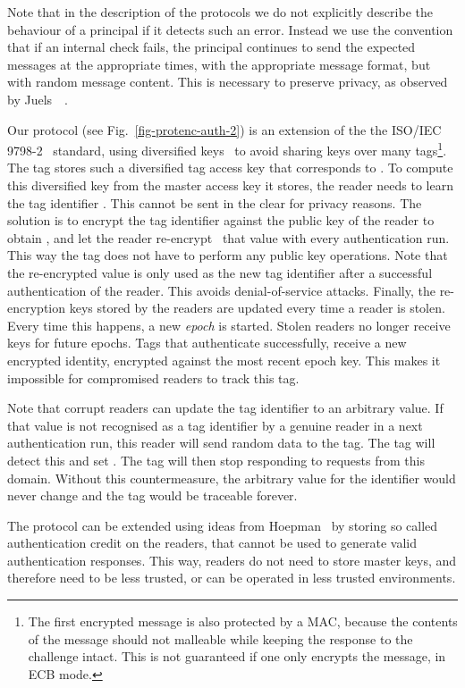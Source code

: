 Note that in the description of the protocols we do not explicitly describe the
behaviour of a principal if it detects such an error. Instead we use the
convention that if an internal check fails, the principal continues to send the
expected messages at the appropriate times, with the appropriate message
format, but with random message content. This is necessary to preserve privacy,
as observed by 
Juels~\etal~\cite{juels2006strong-privacy-rfid,juels2007strong-privacy-rfid}.

Our protocol (see Fig.~\ref{fig-protenc-auth-2})
is an extension of the the ISO/IEC 9798-2~\cite{ISO9798-2}
standard, using diversified keys~\cite{AndB96} to avoid sharing keys over many
tags\footnote{The first encrypted message is also protected by a MAC, because
	the contents of the message should not malleable while keeping the
	response to the challenge intact. This is not guaranteed if one only
	encrypts the message, \eg in ECB mode.
}. 
The tag stores such a diversified
tag access key  that corresponds to
. 
To compute this diversified key from the master access key
 it stores, the reader needs to
learn the tag identifier . 
This cannot be sent in the clear for privacy reasons. The solution is 
to encrypt the tag identifier  against the public key of the reader
to obtain , and let the reader re-encrypt~\cite{juels2003squealing}
that value with every authentication run. This way the tag does not have to perform any public key operations.
Note that the re-encrypted value is only used as the new tag identifier after a
successful authentication of the reader. This avoids denial-of-service attacks.
Finally, the re-encryption keys stored by the readers are updated every time
a reader is stolen. Every time this happens, a new \emph{epoch} is
started.
Stolen readers no longer receive keys for future epochs. Tags that 
authenticate successfully, receive a new encrypted identity, encrypted against
the most recent epoch key. This makes it impossible for compromised readers to
track this tag.

Note that corrupt readers can update the tag identifier to an arbitrary
value. If that value is not recognised as a tag identifier by a genuine reader
in a next authentication run, this reader will send random data to the tag. The
tag will detect this and set 
. The tag will then stop responding to
requests from this domain. 
Without this countermeasure, the arbitrary value for the identifier would never
change and the tag would be traceable forever.


The protocol can be extended using ideas from Hoepman~\etal\cite{Hoe00} by
storing so called authentication credit on the readers, that cannot be used to
generate valid authentication responses. This way, readers do not need to store
master keys, and therefore need to be less trust\-ed, or can be operated in less
trusted environments.


